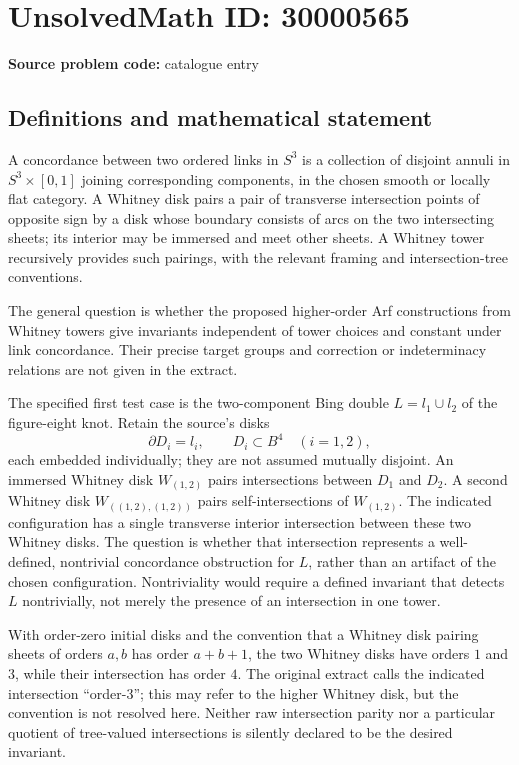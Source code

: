 \documentclass[11pt]{article}
\begin{document}
\section*{UnsolvedMath ID: 30000565}
\textbf{Source problem code:} catalogue entry
\subsection{Definitions and mathematical statement}
A concordance between two ordered links in $S^3$ is a collection of disjoint annuli in $S^3\times[0,1]$ joining corresponding components, in the chosen smooth or locally flat category. A Whitney disk pairs a pair of transverse intersection points of opposite sign by a disk whose boundary consists of arcs on the two intersecting sheets; its interior may be immersed and meet other sheets. A Whitney tower recursively provides such pairings, with the relevant framing and intersection-tree conventions.

The general question is whether the proposed higher-order Arf constructions from Whitney towers give invariants independent of tower choices and constant under link concordance. Their precise target groups and correction or indeterminacy relations are not given in the extract.

The specified first test case is the two-component Bing double $L=l_1\cup l_2$ of the figure-eight knot. Retain the source's disks
\[
\partial D_i=l_i,\qquad D_i\subset B^4\quad(i=1,2),
\]
each embedded individually; they are not assumed mutually disjoint. An immersed Whitney disk $W_{(1,2)}$ pairs intersections between $D_1$ and $D_2$. A second Whitney disk $W_{((1,2),(1,2))}$ pairs self-intersections of $W_{(1,2)}$. The indicated configuration has a single transverse interior intersection between these two Whitney disks. The question is whether that intersection represents a well-defined, nontrivial concordance obstruction for $L$, rather than an artifact of the chosen configuration. Nontriviality would require a defined invariant that detects $L$ nontrivially, not merely the presence of an intersection in one tower.

With order-zero initial disks and the convention that a Whitney disk pairing sheets of orders $a,b$ has order $a+b+1$, the two Whitney disks have orders $1$ and $3$, while their intersection has order $4$. The original extract calls the indicated intersection ``order-3''; this may refer to the higher Whitney disk, but the convention is not resolved here. Neither raw intersection parity nor a particular quotient of tree-valued intersections is silently declared to be the desired invariant.
\end{document}
